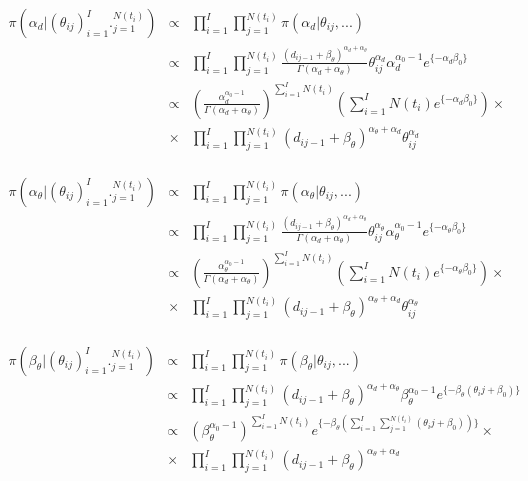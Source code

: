 \begin{eqnarray*}
\pi(\alpha_d|(\theta_{ij})_{i=1}^I ._{j=1}^{N(t_i)})&\propto & \prod_{i=1}^I \prod_{j=1}^{N(t_i)} \pi(\alpha_d|\theta_{ij},...)\\
&\propto & \prod_{i=1}^I \prod_{j=1}^{N(t_i)} \frac{(d_{ij-1}+\beta_\theta)^{\alpha_d+\alpha_\theta}}{\Gamma(\alpha_d+\alpha_\theta)} \theta_{ij}^{\alpha_d}\alpha_d^{\alpha_0-1}e^{\{-\alpha_d\beta_0\}}\\
&\propto & (\frac{\alpha_d^{\alpha_0 -1}}{\Gamma(\alpha_d+\alpha_\theta)})^{\sum_{i=1}^I N(t_i)} (\sum_{i=1}^I N(t_i) e^{\{-\alpha_d\beta_0\}}) \times \\
&\times & \prod_{i=1}^I \prod_{j=1}^{N(t_i)} (d_{ij-1}+\beta_\theta)^{\alpha_\theta+\alpha_d} \theta_{ij}^{\alpha_d}
\end{eqnarray*}
\\
\begin{eqnarray*}
\pi(\alpha_\theta|(\theta_{ij})_{i=1}^I ._{j=1}^{N(t_i)})&\propto & \prod_{i=1}^I \prod_{j=1}^{N(t_i)} \pi(\alpha_\theta|\theta_{ij},...)\\
&\propto &\prod_{i=1}^I \prod_{j=1}^{N(t_i)} \frac{(d_{ij-1}+\beta_\theta)^{\alpha_d+\alpha_\theta}}{\Gamma(\alpha_d+\alpha_\theta)} \theta_{ij}^{\alpha_\theta}\alpha_\theta^{\alpha_0-1}e^{\{-\alpha_\theta\beta_0\}}\\
&\propto & (\frac{\alpha_\theta^{\alpha_0 -1}}{\Gamma(\alpha_d+\alpha_\theta)})^{\sum_{i=1}^I N(t_i)} (\sum_{i=1}^I N(t_i) e^{\{-\alpha_\theta\beta_0\}}) \times \\
&\times & \prod_{i=1}^I \prod_{j=1}^{N(t_i)} (d_{ij-1}+\beta_\theta)^{\alpha_\theta+\alpha_d} \theta_{ij}^{\alpha_\theta}
\end{eqnarray*}
\\
\begin{eqnarray*}
\pi(\beta_\theta|(\theta_{ij})_{i=1}^I ._{j=1}^{N(t_i)})&\propto & \prod_{i=1}^I \prod_{j=1}^{N(t_i)} \pi(\beta_\theta|\theta_{ij},...)\\
&\propto &\prod_{i=1}^I \prod_{j=1}^{N(t_i)} (d_{ij-1}+\beta_\theta)^{\alpha_d+\alpha_\theta}\beta_\theta^{\alpha_0-1} e^{\{-\beta_\theta(\theta_ij+\beta_0)\}}\\
&\propto & (\beta_\theta^{\alpha_0-1})^{\sum_{i=1}^I N(t_i)} e^{\{-\beta_\theta(\sum_{i=1}^I \sum_{j=1}^{N(t_i)}(\theta_ij+\beta_0))\}} \times \\
&\times & \prod_{i=1}^I \prod_{j=1}^{N(t_i)} (d_{ij-1}+\beta_\theta)^{\alpha_\theta+\alpha_d}
\end{eqnarray*}
\\
